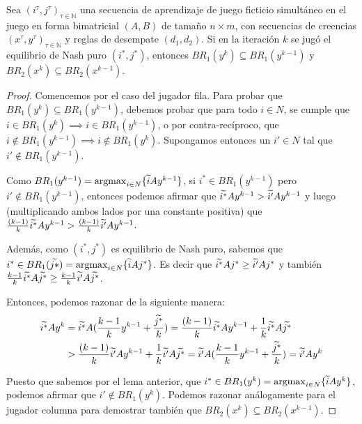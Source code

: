 \begin{lemma}
    Sea $(i^\tau, j^\tau)_{\tau \in \mathbb{N}}$ una secuencia de aprendizaje de juego ficticio simultáneo en el juego en forma bimatricial $(A, B)$ de tamaño $n \times m$, con secuencias de creencias $(x^\tau, y^\tau)_{\tau \in \mathbb{N}}$ y reglas de desempate $(d_1, d_2)$. Si en la iteración $k$ se jugó el equilibrio de Nash puro $(i^*, j^*)$, entonces $BR_1(y^{k}) \subseteq BR_1(y^{k-1})$ y $BR_2(x^{k}) \subseteq BR_2(x^{k-1})$.
\end{lemma}

\begin{proof}
    Comencemos por el caso del jugador fila. Para probar que $BR_1(y^{k}) \subseteq BR_1(y^{k-1})$, debemos probar que para todo $i \in N$, se cumple que $i \in BR_1(y^{k}) \implies i \in BR_1(y^{k-1})$, o por contra-recíproco, que $i \notin BR_1(y^{k-1}) \implies i \notin BR_1(y^{k})$. Supongamos entonces un $i' \in N$ tal que $i' \notin BR_1(y^{k-1})$.

    Como $BR_1(y^{k-1}) = \operatorname*{argmax}_{i \in N} \{\widetilde{i}Ay^{k-1}\}$, si $i^* \in BR_1(y^{k-1})$ pero $i' \notin BR_1(y^{k-1})$, entonces podemos afirmar que $\widetilde{i^*}Ay^{k-1} > \widetilde{i'}Ay^{k-1}$ y luego (multiplicando ambos lados por una constante positiva) que $\frac{(k - 1)}{k} \widetilde{i^*}Ay^{k-1} > \frac{(k - 1)}{k} \widetilde{i'}Ay^{k-1}$.
    
    Además, como $(i^*, j^*)$ es equilibrio de Nash puro, sabemos que $i^* \in BR_1(\widetilde{j*}) = \operatorname*{argmax}_{i \in N} \{\widetilde{i}Aj^*\}$. Es decir que $\widetilde{i^*}Aj^* \ge \widetilde{i'}Aj^*$ y también $\frac{k - 1}{k} \widetilde{i^*}A\widetilde{j^*} \ge \frac{k - 1}{k} \widetilde{i'}A\widetilde{j^*}$.

    Entonces, podemos razonar de la siguiente manera:
    \begin{align*}
        \widetilde{i^*}Ay^k &= \widetilde{i^*}A(\frac{k - 1}{k} y^{k-1} + \frac{\widetilde{j^*}}{k}) = \frac{(k - 1)}{k} \widetilde{i^*}Ay^{k-1} + \frac{1}{k}\widetilde{i^*}A\widetilde{j^*}\\
        &> \frac{(k - 1)}{k} \widetilde{i'}Ay^{k-1} + \frac{1}{k}\widetilde{i'}A\widetilde{j^*} = \widetilde{i'}A(\frac{k - 1}{k} y^{k-1} + \frac{\widetilde{j^*}}{k}) = \widetilde{i'}Ay^k
    \end{align*}

    Puesto que sabemos por el lema anterior, que $i^* \in BR_1(y^{k}) = \operatorname*{argmax}_{i \in N} \{\widetilde{i}Ay^{k}\}$, podemos afirmar que $i' \notin BR_1(y^{k})$.
    Podemos razonar análogamente para el jugador columna para demostrar también que $BR_2(x^{k}) \subseteq BR_2(x^{k-1})$.
\end{proof}

